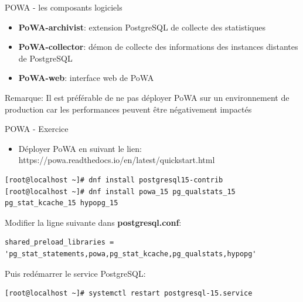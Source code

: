 
\begin{frame}{POWA - les composants logiciels}

   \begin{itemize}
      \item \textbf{PoWA-archivist}: extension PostgreSQL de collecte des statistiques
      \item \textbf{PoWA-collector}: démon de collecte des informations des instances distantes de PostgreSQL
      \item \textbf{PoWA-web}: interface web de PoWA
   \end{itemize}

   Remarque: Il est préférable de ne pas déployer PoWA sur un environnement de production car les performances peuvent être négativement impactés

\end{frame}


\begin{frame}[fragile]{POWA - Exercice }

   \begin{itemize}
      \item Déployer PoWA en suivant le lien: https://powa.readthedocs.io/en/latest/quickstart.html
   \end{itemize}

\begin{tiny}
\begin{Verbatim}[commandchars=\\\{\}]
[root@localhost ~]# dnf install postgresql15-contrib
[root@localhost ~]# dnf install powa_15 pg_qualstats_15 pg_stat_kcache_15 hypopg_15
\end{Verbatim}
\end{tiny}

   Modifier la ligne suivante dans \textbf{postgresql.conf}:

\begin{tiny}
\begin{Verbatim}[commandchars=\\\{\}]
shared_preload_libraries = 'pg_stat_statements,powa,pg_stat_kcache,pg_qualstats,hypopg'
\end{Verbatim}
\end{tiny}

Puis redémarrer le service PostgreSQL:
\begin{tiny}
\begin{Verbatim}[commandchars=\\\{\}]
[root@localhost ~]# systemctl restart postgresql-15.service
\end{Verbatim}
\end{tiny}

\end{frame}

